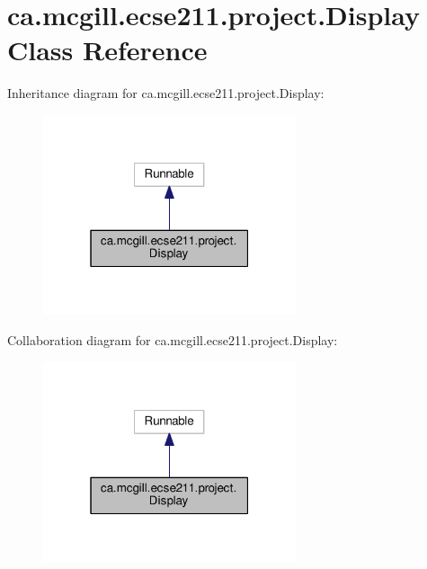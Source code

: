 \hypertarget{classca_1_1mcgill_1_1ecse211_1_1project_1_1_display}{}\section{ca.\+mcgill.\+ecse211.\+project.\+Display Class Reference}
\label{classca_1_1mcgill_1_1ecse211_1_1project_1_1_display}


Inheritance diagram for ca.\+mcgill.\+ecse211.\+project.\+Display\+:\nopagebreak
\begin{figure}[H]
\begin{center}
\leavevmode
\includegraphics[width=211pt]{classca_1_1mcgill_1_1ecse211_1_1project_1_1_display__inherit__graph}
\end{center}
\end{figure}


Collaboration diagram for ca.\+mcgill.\+ecse211.\+project.\+Display\+:\nopagebreak
\begin{figure}[H]
\begin{center}
\leavevmode
\includegraphics[width=211pt]{classca_1_1mcgill_1_1ecse211_1_1project_1_1_display__coll__graph}
\end{center}
\end{figure}
